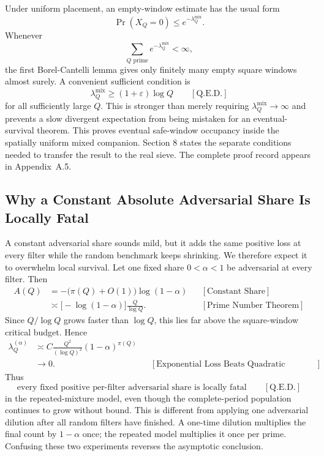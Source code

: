 Under uniform placement, an empty-window estimate has the usual form
\begin{equation*}
\Pr(X_Q=0)\le e^{-\lambda_Q^{\mathrm{mix}}}.
\end{equation*}
Whenever
\begin{equation*}
\sum_{Q\text{ prime}}e^{-\lambda_Q^{\mathrm{mix}}} < \infty,
\end{equation*}
the first Borel-Cantelli lemma gives only finitely many empty square windows almost surely. A convenient sufficient condition is
\begin{equation*}
\lambda_Q^{\mathrm{mix}}\ge(1+\varepsilon)\log Q
\qquad[\text{Q.E.D.}]
\end{equation*}
for all sufficiently large $Q$. This is stronger than merely requiring $\lambda_Q^{\mathrm{mix}}\to\infty$ and prevents a slow divergent expectation from being mistaken for an eventual-survival theorem.
This proves eventual safe-window occupancy inside the spatially uniform mixed companion. Section 8 states the separate conditions needed to transfer the result to the real sieve.
The complete proof record appears in Appendix~A.5.
\subsection{Why a Constant Absolute Adversarial Share Is Locally Fatal}
A constant adversarial share sounds mild, but it adds the same positive loss at every filter while the random benchmark keeps shrinking. We therefore expect it to overwhelm local survival. Let one fixed share $0 < \alpha < 1$ be adversarial at every filter. Then
\begin{equation*}
\begin{aligned}
A(Q)
&=-\bigl(\pi(Q)+O(1)\bigr)\log(1-\alpha)
&&[\text{Constant Share}]\\
&\asymp
\bigl[-\log(1-\alpha)\bigr]\frac{Q}{\log Q}.
&&[\text{Prime Number Theorem}]
\end{aligned}
\end{equation*}
Since $Q/\log Q$ grows faster than $\log Q$, this lies far above the square-window critical budget. Hence
\begin{equation*}
\begin{aligned}
\lambda_Q^{(\alpha)}
&\asymp
C\frac{Q^2}{(\log Q)^2}(1-\alpha)^{\pi(Q)}\\
&\longrightarrow0.
&&[\text{Exponential Loss Beats Quadratic Growth}]
\end{aligned}
\end{equation*}
Thus
\begin{equation*}
\text{every fixed positive per-filter adversarial share is locally fatal}
\qquad[\text{Q.E.D.}]
\end{equation*}
in the repeated-mixture model, even though the complete-period population continues to grow without bound.
This is different from applying one adversarial dilution after all random filters have finished. A one-time dilution multiplies the final count by $1-\alpha$ once; the repeated model multiplies it once per prime. Confusing these two experiments reverses the asymptotic conclusion.
